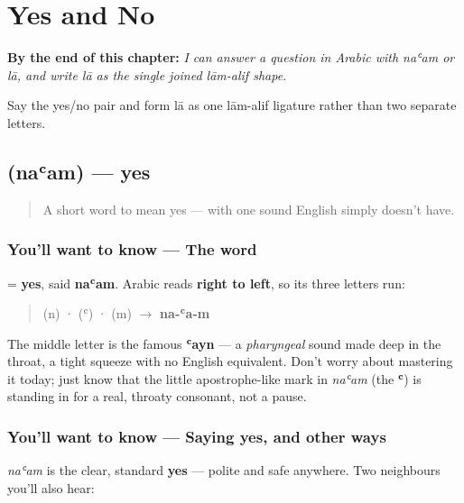 
\chapter{Yes and No}
\label{ch:ar-yes-and-no}

\begin{chapteropening}
\textbf{By the end of this chapter:} \emph{I can answer a question in Arabic with naʿam or lā, and write lā as the single joined lām-alif shape.}

Say the yes/no pair and form lā as one lām-alif ligature rather than two separate letters.
\end{chapteropening}

\section[\texorpdfstring{\ar{نعم} (naʿam)}{نعم (naʿam)}]{ (naʿam) — yes}

\label{lesson:AR-C05-naam}



\begin{quote}
A short word to mean yes — with one sound English simply doesn't have.
\end{quote}

\subsection*{You'll want to know — The word}
\textbf{} = \textbf{yes}, said \textbf{naʿam}. Arabic reads \textbf{right to left}, so its three letters run:

\begin{quote}
  (n) ·   (ʿ) ·   (m)  $\to$  \textbf{na‑ʿa‑m}
\end{quote}

The middle letter \textbf{} is the famous \textbf{ʿayn} — a \emph{pharyngeal} sound made deep in the throat, a tight squeeze with no English equivalent. Don't worry about mastering it today; just know that the little apostrophe-like mark in \emph{naʿam} (the \textbf{ʿ}) is standing in for a real, throaty consonant, not a pause.

\subsection*{You'll want to know — Saying yes, and other ways}
\emph{naʿam} is the clear, standard \textbf{yes} — polite and safe anywhere. Two neighbours you'll also hear:

